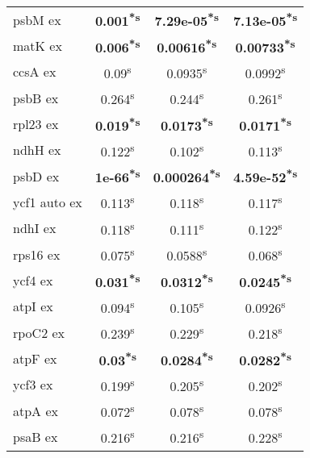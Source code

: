 \documentclass[a4paper]{article}
\begin{document}
\begin{longtable}{l|c|c|c}
psbM ex&\textbf{0.001\textsuperscript{*}\textsuperscript{s}}&\textbf{7.29e-05\textsuperscript{*}\textsuperscript{s}}&\textbf{7.13e-05\textsuperscript{*}\textsuperscript{s}}\\
matK ex&\textbf{0.006\textsuperscript{*}\textsuperscript{s}}&\textbf{0.00616\textsuperscript{*}\textsuperscript{s}}&\textbf{0.00733\textsuperscript{*}\textsuperscript{s}}\\
ccsA ex&0.09\textsuperscript{s}&0.0935\textsuperscript{s}&0.0992\textsuperscript{s}\\
psbB ex&0.264\textsuperscript{s}&0.244\textsuperscript{s}&0.261\textsuperscript{s}\\
rpl23 ex&\textbf{0.019\textsuperscript{*}\textsuperscript{s}}&\textbf{0.0173\textsuperscript{*}\textsuperscript{s}}&\textbf{0.0171\textsuperscript{*}\textsuperscript{s}}\\
ndhH ex&0.122\textsuperscript{s}&0.102\textsuperscript{s}&0.113\textsuperscript{s}\\
psbD ex&\textbf{1e-66\textsuperscript{*}\textsuperscript{s}}&\textbf{0.000264\textsuperscript{*}\textsuperscript{s}}&\textbf{4.59e-52\textsuperscript{*}\textsuperscript{s}}\\
ycf1 auto ex&0.113\textsuperscript{s}&0.118\textsuperscript{s}&0.117\textsuperscript{s}\\
ndhI ex&0.118\textsuperscript{s}&0.111\textsuperscript{s}&0.122\textsuperscript{s}\\
rps16 ex&0.075\textsuperscript{s}&0.0588\textsuperscript{s}&0.068\textsuperscript{s}\\
ycf4 ex&\textbf{0.031\textsuperscript{*}\textsuperscript{s}}&\textbf{0.0312\textsuperscript{*}\textsuperscript{s}}&\textbf{0.0245\textsuperscript{*}\textsuperscript{s}}\\
atpI ex&0.094\textsuperscript{s}&0.105\textsuperscript{s}&0.0926\textsuperscript{s}\\
rpoC2 ex&0.239\textsuperscript{s}&0.229\textsuperscript{s}&0.218\textsuperscript{s}\\
atpF ex&\textbf{0.03\textsuperscript{*}\textsuperscript{s}}&\textbf{0.0284\textsuperscript{*}\textsuperscript{s}}&\textbf{0.0282\textsuperscript{*}\textsuperscript{s}}\\
ycf3 ex&0.199\textsuperscript{s}&0.205\textsuperscript{s}&0.202\textsuperscript{s}\\
atpA ex&0.072\textsuperscript{s}&0.078\textsuperscript{s}&0.078\textsuperscript{s}\\
psaB ex&0.216\textsuperscript{s}&0.216\textsuperscript{s}&0.228\textsuperscript{s}\\

\end{longtable}
\end{document}
